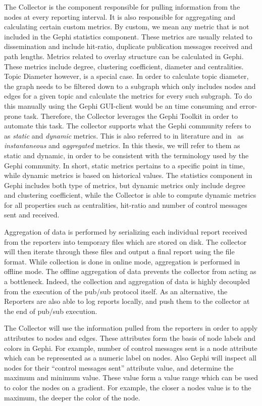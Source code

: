 The Collector is the component responsible for pulling information from
the nodes at every reporting interval. It is also responsible for
aggregating and calculating certain custom metrics. By custom, we mean
any metric that is not included in the Gephi statistics component. These
metrics are usually related to dissemination and include hit-ratio,
duplicate publication messages received and path lengths. Metrics
related to overlay structure can be calculated in Gephi. These metrics
include degree, clustering coefficient, diameter and centralities. Topic
Diameter however, is a special case. In order to calculate topic
diameter, the graph needs to be filtered down to a subgraph which only
includes nodes and edges for a given topic and calculate the metrics for
every such subgraph. To do this manually using
the Gephi GUI-client would be an time consuming and error-prone task.
Therefore, the Collector  leverages the Gephi Toolkit in order to
automate this task. The collector supports what the Gephi community
refers to as \emph{static} and \emph{dynamic} metrics. This is also
referred to in literature and in~\cite{korsveien2014vizpub} as
\emph{instantaneous} and \emph{aggregated} metrics. In this thesis, we
will refer to them as static and dynamic, in order to be consistent
with the terminology used by the Gephi community. In short, static
metrics pertains to a specific point in time, while dynamic metrics is
based on historical values. The statistics component in Gephi includes
both type of metrics, but dynamic metrics only include degree and
clustering coefficient, while the Collector is able to compute dynamic
metrics for all properties such as centralities, hit-ratio and number of
control messages sent and received.

Aggregation of data is performed by serializing each individual report received
from the reporters into temporary files which are stored on disk. The
collector will then iterate through these files and output a final
report using the \gexf{} file format. While collection is done in online
mode, aggregation is performed in offline mode. The offline aggregation
of data prevents the collector from acting as a bottleneck. Indeed, the
collection and aggregation of data is highly decoupled from the
execution of the pub/sub protocol itself. As an alternative,
the Reporters are also able to log reports locally, and push them to
the collector at the end of pub/sub execution.

The Collector will use the information pulled from the reporters in
order to apply attributes to nodes and edges. These attributes form the
basis of node labels and colors in Gephi. For example, number of
control messages sent is a node attribute which can be represented as a
numeric label on nodes. Also Gephi will inspect all nodes for their
``control messages sent'' attribute value, and determine the maximum and
minimum value. These value form a value range which can be used to color
the nodes on a gradient. For example, the closer a nodes value is to the
maximum, the deeper the color of the node.

